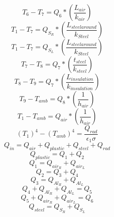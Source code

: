 \documentclass[11pt,english]{article}
\begin{document}
\begin{equation}\label{twelfth}
T_6-T_7=Q_{6}*(\frac{L_{air}}{k_{air}})
\end{equation}
\begin{equation}\label{thirteenth}
T_1-T_7=Q_{S_R}*(\frac{L_{steel around}}{k_{Steel}})
\end{equation}
\begin{equation}\label{fourteenth}
T_1-T_7=Q_{S_L}*(\frac{L_{steel around}}{k_{Steel}})
\end{equation}
\begin{equation}\label{fifteenth}
T_7-T_8=Q_{7}*(\frac{t_{steel}}{k_{steel}})
\end{equation}
\begin{equation}\label{sixteenth}
T_8-T_9=Q_{7}*(\frac{L_{insulation}}{k_{insulation}})
\end{equation}
\begin{equation}\label{seventeenth}
T_9-T_{amb}=Q_{8}*(\frac{1}{h_{air}})
\end{equation}
\begin{equation}\label{eighteenth}
T_1-T_{amb}=Q_{air}*(\frac{1}{h_{air}})
\end{equation}
\begin{equation}\label{nineteenth}
(T_1)^4-(T_{amb})^4=\frac{Q_{rad}}{\epsilon_1 \sigma}
\end{equation}
\begin{equation}\label{twenty}
Q_{in}=Q_{air}+Q_{plastic}+Q_{steel}+Q_{rad}
\end{equation}
\begin{equation}\label{twentyone}
Q_{plastic}=Q_{1}+Q_{2}
\end{equation}
\begin{equation}\label{twentytwo}
Q_{1}=Q_{air_R}+Q_{air_L}
\end{equation}
\begin{equation}\label{twentythree}
Q_{2}=Q_{3}+Q_{4}
\end{equation}
\begin{equation}\label{twentyfour}
Q_{3}=Q_{Al_R}+Q_{Al_L}
\end{equation}
\begin{equation}\label{twentyfive}
Q_{4}+Q_{Al_R}+Q_{Al_L}=Q_{5}
\end{equation}
\begin{equation}\label{twentysix}
Q_{5}+Q_{air_R}+Q_{air_L}=Q_{6}
\end{equation}
\begin{equation}\label{twentyseven}
Q_{steel}=Q_{S_R}+Q_{S_L}
\end{equation}
\end{document}
